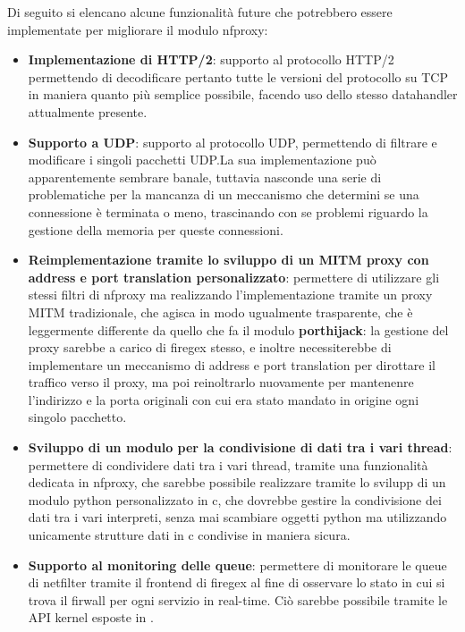 Di seguito si elencano alcune funzionalità future che potrebbero essere implementate per migliorare il modulo nfproxy:

\begin{itemize}
    \setlength{\itemsep}{2pt}
    \setlength{\parskip}{2pt}
    \item \textbf{Implementazione di HTTP/2}: supporto al protocollo HTTP/2 permettendo di decodificare pertanto tutte le versioni del protocollo su TCP in maniera quanto più semplice possibile, facendo uso dello stesso datahandler attualmente presente.
    \item \textbf{Supporto a UDP}: supporto al protocollo UDP, permettendo di filtrare e modificare i singoli pacchetti UDP.\@ La sua implementazione può apparentemente sembrare banale, tuttavia nasconde una serie di problematiche per la mancanza di un meccanismo che determini se una connessione è terminata o meno, trascinando con se problemi riguardo la gestione della memoria per queste connessioni.
    \item \textbf{Reimplementazione tramite lo sviluppo di un MITM proxy con address e port translation personalizzato}: permettere di utilizzare gli stessi filtri di nfproxy ma realizzando l'implementazione tramite un proxy MITM tradizionale, che agisca in modo ugualmente trasparente, che è leggermente differente da quello che fa il modulo \textbf{porthijack}: la gestione del proxy sarebbe a carico di firegex stesso, e inoltre necessiterebbe di implementare un meccanismo di address e port translation per dirottare il traffico verso il proxy, ma poi reinoltrarlo nuovamente per mantenenre l'indirizzo e la porta originali con cui era stato mandato in origine ogni singolo pacchetto.
    \item \textbf{Sviluppo di un modulo per la condivisione di dati tra i vari thread}: permettere di condividere dati tra i vari thread, tramite una funzionalità dedicata in nfproxy, che sarebbe possibile realizzare tramite lo svilupp di un modulo python personalizzato in c, che dovrebbe gestire la condivisione dei dati tra i vari interpreti, senza mai scambiare oggetti python ma utilizzando unicamente strutture dati in c condivise in maniera sicura.
    \item \textbf{Supporto al monitoring delle queue}: permettere di monitorare le queue di netfilter tramite il frontend di firegex al fine di osservare lo stato in cui si trova il firwall per ogni servizio in real-time. Ciò sarebbe possibile tramite le API kernel esposte in .
\end{itemize}
